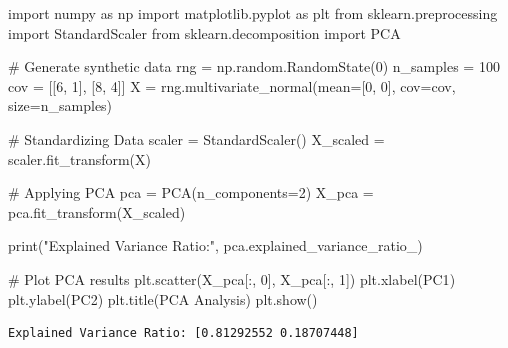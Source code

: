 \documentclass[
  letterpaper,
  DIV=11,
  numbers=noendperiod]{scrreprt}
\newenvironment{Shaded}{\begin{snugshade}}{\end{snugshade}}
\newcommand{\BuiltInTok}[1]{\textcolor[rgb]{0.00,0.23,0.31}{#1}}
\newcommand{\CommentTok}[1]{\textcolor[rgb]{0.37,0.37,0.37}{#1}}
\newcommand{\DecValTok}[1]{\textcolor[rgb]{0.68,0.00,0.00}{#1}}
\newcommand{\ImportTok}[1]{\textcolor[rgb]{0.00,0.46,0.62}{#1}}
\newcommand{\NormalTok}[1]{\textcolor[rgb]{0.00,0.23,0.31}{#1}}
\newcommand{\OperatorTok}[1]{\textcolor[rgb]{0.37,0.37,0.37}{#1}}
\newcommand{\StringTok}[1]{\textcolor[rgb]{0.13,0.47,0.30}{#1}}
\begin{document}
\begin{Shaded}
\begin{Highlighting}[]
\ImportTok{import}\NormalTok{ numpy }\ImportTok{as}\NormalTok{ np}
\ImportTok{import}\NormalTok{ matplotlib.pyplot }\ImportTok{as}\NormalTok{ plt}
\ImportTok{from}\NormalTok{ sklearn.preprocessing }\ImportTok{import}\NormalTok{ StandardScaler}
\ImportTok{from}\NormalTok{ sklearn.decomposition }\ImportTok{import}\NormalTok{ PCA}

\CommentTok{\# Generate synthetic data}
\NormalTok{rng }\OperatorTok{=}\NormalTok{ np.random.RandomState(}\DecValTok{0}\NormalTok{)}
\NormalTok{n\_samples }\OperatorTok{=} \DecValTok{100}
\NormalTok{cov }\OperatorTok{=}\NormalTok{ [[}\DecValTok{6}\NormalTok{, }\DecValTok{1}\NormalTok{], [}\DecValTok{8}\NormalTok{, }\DecValTok{4}\NormalTok{]]}
\NormalTok{X }\OperatorTok{=}\NormalTok{ rng.multivariate\_normal(mean}\OperatorTok{=}\NormalTok{[}\DecValTok{0}\NormalTok{, }\DecValTok{0}\NormalTok{], cov}\OperatorTok{=}\NormalTok{cov, size}\OperatorTok{=}\NormalTok{n\_samples)}

\CommentTok{\# Standardizing Data}
\NormalTok{scaler }\OperatorTok{=}\NormalTok{ StandardScaler()}
\NormalTok{X\_scaled }\OperatorTok{=}\NormalTok{ scaler.fit\_transform(X)}

\CommentTok{\# Applying PCA}
\NormalTok{pca }\OperatorTok{=}\NormalTok{ PCA(n\_components}\OperatorTok{=}\DecValTok{2}\NormalTok{)}
\NormalTok{X\_pca }\OperatorTok{=}\NormalTok{ pca.fit\_transform(X\_scaled)}

\BuiltInTok{print}\NormalTok{(}\StringTok{"Explained Variance Ratio:"}\NormalTok{, pca.explained\_variance\_ratio\_)}

\CommentTok{\# Plot PCA results}
\NormalTok{plt.scatter(X\_pca[:, }\DecValTok{0}\NormalTok{], X\_pca[:, }\DecValTok{1}\NormalTok{])}
\NormalTok{plt.xlabel(}\StringTok{\textquotesingle{}PC1\textquotesingle{}}\NormalTok{)}
\NormalTok{plt.ylabel(}\StringTok{\textquotesingle{}PC2\textquotesingle{}}\NormalTok{)}
\NormalTok{plt.title(}\StringTok{\textquotesingle{}PCA Analysis\textquotesingle{}}\NormalTok{)}
\NormalTok{plt.show()}
\end{Highlighting}
\end{Shaded}

\begin{verbatim}
Explained Variance Ratio: [0.81292552 0.18707448]
\end{verbatim}
\end{document}
